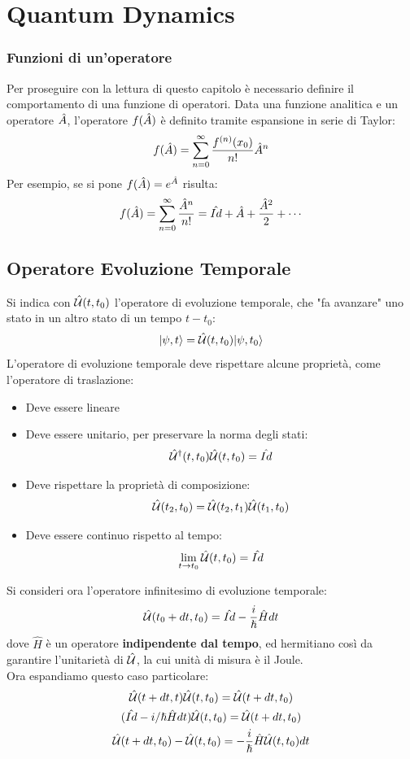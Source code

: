 \section{Quantum Dynamics}
\subsubsection*{Funzioni di un'operatore}
Per proseguire con la lettura di questo capitolo è necessario definire il comportamento di una funzione di operatori. Data una funzione analitica e un operatore $\hat A$, l'operatore $f(\hat A)$ è definito tramite espansione in serie di Taylor:
\[
    f(\hat{A}) = \sum_{n=0}^{\infty} \frac{f^{(n)}(x_0)}{n!} \hat A^n
\]
Per esempio, se si pone $f(\hat A) = e^{\hat A}$ risulta:
\[
    f(\hat A) = \sum_{n=0}^{\infty} \frac{\hat A^n}{n!} = \hat{Id} + \hat A + \frac{\hat A^2}{2} + \cdots
\]
\subsection{Operatore Evoluzione Temporale}
Si indica con $\hat{\mathcal{U}}(t,t_0)$ l'operatore di evoluzione temporale, che "fa avanzare" uno stato in un altro stato di un tempo $t-t_0$:
\[  
    |\psi,t\rangle = \hat{\mathcal{U}}(t,t_0) |\psi,t_0\rangle
\]
L'operatore di evoluzione temporale deve rispettare alcune proprietà, come l'operatore di traslazione:
\begin{itemize}
    \item Deve essere lineare
    \item Deve essere unitario, per preservare la norma degli stati:
    \[
        \hat{\mathcal{U}}^\dag (t,t_0) \hat{\mathcal{U}}(t,t_0) = \hat{Id}
    \]
    \item Deve rispettare la proprietà di composizione:
    \[
        \hat{\mathcal{U}}(t_2,t_0) = \hat{\mathcal{U}}(t_2,t_1) \hat{\mathcal{U}}(t_1,t_0)
    \]
    \item Deve essere continuo rispetto al tempo:
    \[
        \lim_{t \to t_0} \hat{\mathcal{U}}(t,t_0) = \hat{Id}
    \]
\end{itemize}
Si consideri ora l'operatore infinitesimo di evoluzione temporale:
\[
    \hat{\mathcal{U}}(t_0 + dt, t_0) = \hat{Id} - \frac i {\hslash} \hat H dt
\]
dove $\hat H$ è un operatore \textbf{indipendente dal tempo}, ed hermitiano così da garantire l'unitarietà di $\hat{\mathcal{U}}$, la cui unità di misura è il Joule. \\
Ora espandiamo questo caso particolare:
\begin{gather*}
    \hat{\mathcal{U}}(t + dt, t) \hat{\mathcal{U}}(t, t_0) = \hat{\mathcal{U}}(t + dt, t_0) \\
    (\hat{Id} - i / \hslash \hat H dt) \hat{\mathcal{U}}(t, t_0) = \hat{\mathcal{U}}(t + dt, t_0) \\
    \hat{\mathcal{U}}(t + dt, t_0) - \hat{\mathcal{U}}(t, t_0) = -\frac{i}{\hslash} \hat H \hat{\mathcal{U}}(t, t_0) dt
\end{gather*}

